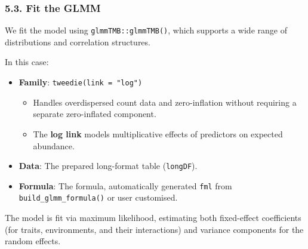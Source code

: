 \documentclass[
]{article}
\providecommand{\tightlist}{%
  \setlength{\itemsep}{0pt}\setlength{\parskip}{0pt}}
\begin{document}
\hypertarget{fit-the-glmm}{%
\subsubsection{5.3. Fit the GLMM}\label{fit-the-glmm}}

We fit the model using \texttt{glmmTMB::glmmTMB()}, which supports a
wide range of distributions and correlation structures.

In this case:

\begin{itemize}
\tightlist
\item
  \textbf{Family}: \texttt{tweedie(link\ =\ "log")}

  \begin{itemize}
  \tightlist
  \item
    Handles overdispersed count data and zero-inflation without
    requiring a separate zero-inflated component.
  \item
    The \textbf{log link} models multiplicative effects of predictors on
    expected abundance.
  \end{itemize}
\item
  \textbf{Data}: The prepared long-format table (\texttt{longDF}).
\item
  \textbf{Formula}: The formula, automatically generated \texttt{fml}
  from \texttt{build\_glmm\_formula()} or user customised.
\end{itemize}

The model is fit via maximum likelihood, estimating both fixed-effect
coefficients (for traits, environments, and their interactions) and
variance components for the random effects.
\end{document}
